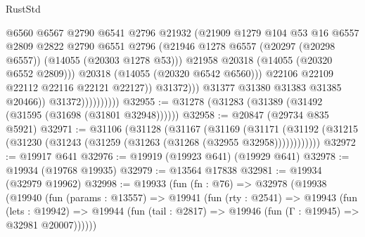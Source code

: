\begin{lexlean}{RustStd}
\begin{coremodule}
                                        @6560
                                        @6567
                                        @2790
                                        @6541
                                        @2796
                                        @21932
                                        (@21909
                                          @1279
                                          @104
                                          @53
                                          @16
                                          @6557
                                          @2809
                                          @2822
                                          @2790
                                          @6551
                                          @2796
                                          (@21946
                                            @1278
                                            @6557
                                            (@20297 (@20298 @6557))
                                            (@14055 (@20303 @1278 @53)))
                                          @21958
                                          @20318
                                          (@14055 (@20320 @6552 @2809)))
                                        @20318
                                        (@14055 (@20320 @6542 @6560)))
                                      @22106
                                      @22109
                                      @22112
                                      @22116
                                      @22121
                                      @22127))
                                  @31372)))
                            @31377
                            @31380
                            @31383
                            @31385
                            @20466))
                        @31372))))))))))
@32955 := @31278 (@31283 (@31389 (@31492 (@31595 (@31698 (@31801 @32948))))))
@32958 := @20847 (@29734 @835 @5921)
@32971 := @31106
    (@31128
      (@31167
        (@31169
          (@31171 (@31192 (@31215 (@31230 (@31243 (@31259 (@31263 (@31268 (@32955 @32958))))))))))))
@32972 := @19917 @641
@32976 := @19919 (@19923 @641) (@19929 @641)
@32978 := @19934 (@19768 @19935)
@32979 := @13564 @17838
@32981 := @19934 (@32979 @19962)
@32998 := @19933
    (fun (fn : @76) =>
    @32978
      (@19938
        (@19940
          (fun (params : @13557) =>
          @19941
            (fun (rty : @2541) =>
            @19943
              (fun (lets : @19942) =>
              @19944 (fun (tail : @2817) => @19946 (fun (Γ : @19945) => @32981 @20007))))))

\end{coremodule}
\end{lexlean}
